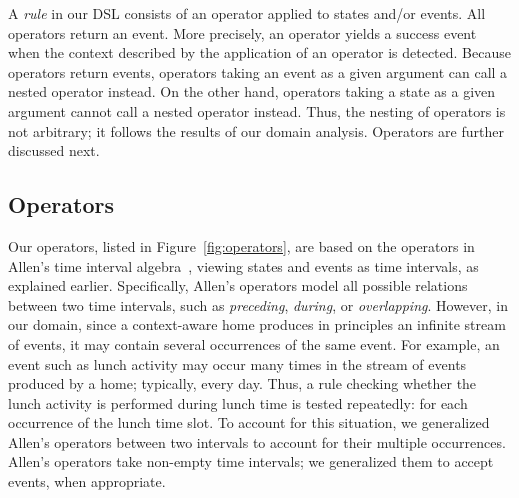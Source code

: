 A {\em rule} in our DSL consists of an operator applied to states and/or events. All operators return an event.
More precisely, an operator yields a success event when the context described by the application of an operator is detected. 
Because operators return events, operators taking an event as a given argument can call a nested operator instead.
On the other hand, operators taking a state as a given argument cannot call a nested operator instead.
Thus, the nesting of operators is not arbitrary; it follows the results of our domain analysis. Operators are further discussed next.

\subsection{Operators}
Our operators, listed in Figure~\ref{fig:operators}, are based on the operators in Allen's time interval algebra~\cite{Allen}, viewing states and events as time intervals, as explained earlier. Specifically, Allen's operators model all possible relations between two time intervals, such as {\em preceding}, {\em during}, or {\em overlapping}. However, in our domain, since a context-aware home produces in principles an infinite stream of events, it may contain several occurrences of the same event. For example, an event such as lunch activity may occur many times in the stream of events produced by a home; typically, every day. Thus, a rule checking whether the lunch activity is performed during lunch time is tested repeatedly: for each occurrence of the lunch time slot. To account for this situation, we generalized Allen's operators between two intervals to account for their multiple occurrences. Allen's operators take non-empty time intervals; we generalized them to accept events, when appropriate.



